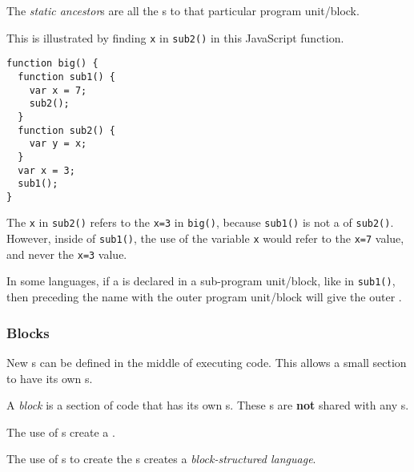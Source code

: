\begin{definition}\label{def:Variable_Static_Ancestor}
  The \emph{static ancestor}s are all the s to that particular program unit/block.
\end{definition}

This is illustrated by finding \texttt{x} in \texttt{sub2()} in this JavaScript function.
\begin{verbatim}
function big() {
  function sub1() {
    var x = 7;
    sub2();
  }
  function sub2() {
    var y = x;
  }
  var x = 3;
  sub1();
}
\end{verbatim}
The \texttt{x} in \texttt{sub2()} refers to the \texttt{x=3} in \texttt{big()}, because \texttt{sub1()} is not a  of \texttt{sub2()}.
However, inside of \texttt{sub1()}, the use of the variable \texttt{x} would refer to the \texttt{x=7} value, and never the \texttt{x=3} value.

In some languages, if a  is declared in a sub-program unit/block, like in \texttt{sub1()}, then preceding the  name with the outer program unit/block will give the outer  .

\subsubsection{Blocks}\label{subsubsec:Variable_Blocks}
New s can be defined in the middle of executing code.
This allows a small section to have its own s.

\begin{definition}[Block]\label{def:Block_Scope}
  A \emph{block} is a section of code that has its own s.
  These s are \textbf{not} shared with any s.
\end{definition}

The use of s create a .

\begin{definition}\label{def:Block_Structured_Language}
  The use of s to create the s creates a \emph{block-structured language}.
\end{definition}

